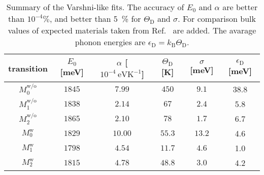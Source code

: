 \begin{table}
	\centering
	\caption{Summary of the Varshni-like fits. The accuracy of $E_0$ and $\alpha$ are better than $10^{-4}\%$, and better than 5~\% for $\Theta_\mathrm{D}$ and $\sigma$. For comparison bulk values of expected materials taken from Ref.~\cite{Vurgaftman} are added. The avarage phonon energies are $\epsilon_\mathrm{D}=k_\mathrm{B}\Theta_\mathrm{D}$.}
	\begin{tabularx}{1\textwidth}{cccccc}
		\toprule
		
		transition & $E_0$ [meV]& $\alpha$ [$10^{-4}~\mathrm{eVK^{-1}}$]& $\Theta_\mathrm{D}$ [K]& $\sigma$ [meV]&  $\epsilon_\mathrm{D}$ [meV]\\ 	
		\midrule
		\midrule
		$M_0^\mathrm{w/o}$& $1845$ & $7.99$& $450$&$9.1$& 38.8\\
		$M_1^\mathrm{w/o}$& $1838$ & $2.14$& $67$&$2.4$&5.8\\
		$M_2^\mathrm{w/o}$ & $1865$ & $2.10$& $78$& $1.7$&6.7\\ 
		
		
		
		\midrule
		$M_0^\mathrm{w}$& $1829$ & $10.00$& $55.3$& $13.2$&4.6\\
		$M_1^\mathrm{w}$& $1798$ & $4.54$& $11.7$&$4.6$&1.0\\
		$M_2^\mathrm{w}$ & $1815$& $4.78$& $48.8$& $3.0$&4.2\\ 
		
		
		
		
		\midrule
		

\end{tabularx}
\end{table}
